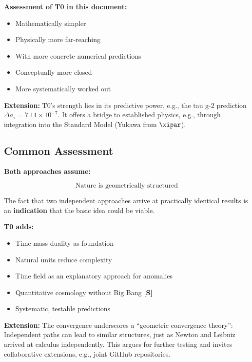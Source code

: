 	\textbf{Assessment of T0 in this document:}
	\begin{itemize}
		\item Mathematically simpler
		\item Physically more far-reaching
		\item With more concrete numerical predictions
		\item Conceptually more closed
		\item More systematically worked out
	\end{itemize}
	
	\textbf{Extension:} T0's strength lies in its predictive power, e.g., the tau g-2 prediction $\Delta a_\tau = 7.11 \times 10^{-7}$. It offers a bridge to established physics, e.g., through integration into the Standard Model (Yukawa from $\xipar$).
	
	\subsection{Common Assessment}
	
	\begin{gemeinsam}
		\textbf{Both approaches assume:}
		
		\begin{equation}
			\boxed{\text{Nature is geometrically structured}}
		\end{equation}
		
		The fact that two independent approaches arrive at practically identical results is an \textbf{indication} that the basic idea could be viable.
		
		\textbf{T0 adds:}
		\begin{itemize}
			\item Time-mass duality as foundation
			\item Natural units reduce complexity
			\item Time field as an explanatory approach for anomalies
			\item Quantitative cosmology without Big Bang \textbf{[S]}
			\item Systematic, testable predictions
		\end{itemize}
		
		\textbf{Extension:} The convergence underscores a ``geometric convergence theory'': Independent paths can lead to similar structures, just as Newton and Leibniz arrived at calculus independently. This argues for further testing and invites collaborative extensions, e.g., joint GitHub repositories.
	\end{gemeinsam}
	
